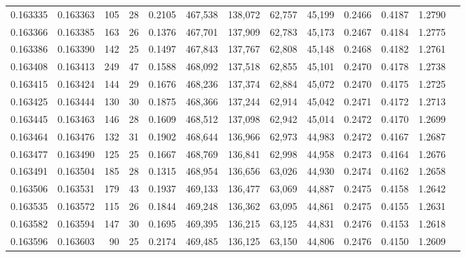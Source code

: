 \begin{tabular}{rrrrrrrrrrrrr}
0.163335 & 0.163363 &   105 &  28 &                                     0.2105 & 467,538 & 138,072 &  62,757 &  45,199 & 0.2466 & 0.4187 & 1.2790 \\
0.163366 & 0.163385 &   163 &  26 &                                     0.1376 & 467,701 & 137,909 &  62,783 &  45,173 & 0.2467 & 0.4184 & 1.2775 \\
0.163386 & 0.163390 &   142 &  25 &                                     0.1497 & 467,843 & 137,767 &  62,808 &  45,148 & 0.2468 & 0.4182 & 1.2761 \\
0.163408 & 0.163413 &   249 &  47 &                                     0.1588 & 468,092 & 137,518 &  62,855 &  45,101 & 0.2470 & 0.4178 & 1.2738 \\
0.163415 & 0.163424 &   144 &  29 &                                     0.1676 & 468,236 & 137,374 &  62,884 &  45,072 & 0.2470 & 0.4175 & 1.2725 \\
0.163425 & 0.163444 &   130 &  30 &                                     0.1875 & 468,366 & 137,244 &  62,914 &  45,042 & 0.2471 & 0.4172 & 1.2713 \\
0.163445 & 0.163463 &   146 &  28 &                                     0.1609 & 468,512 & 137,098 &  62,942 &  45,014 & 0.2472 & 0.4170 & 1.2699 \\
0.163464 & 0.163476 &   132 &  31 &                                     0.1902 & 468,644 & 136,966 &  62,973 &  44,983 & 0.2472 & 0.4167 & 1.2687 \\
0.163477 & 0.163490 &   125 &  25 &                                     0.1667 & 468,769 & 136,841 &  62,998 &  44,958 & 0.2473 & 0.4164 & 1.2676 \\
0.163491 & 0.163504 &   185 &  28 &                                     0.1315 & 468,954 & 136,656 &  63,026 &  44,930 & 0.2474 & 0.4162 & 1.2658 \\
0.163506 & 0.163531 &   179 &  43 &                                     0.1937 & 469,133 & 136,477 &  63,069 &  44,887 & 0.2475 & 0.4158 & 1.2642 \\
0.163535 & 0.163572 &   115 &  26 &                                     0.1844 & 469,248 & 136,362 &  63,095 &  44,861 & 0.2475 & 0.4155 & 1.2631 \\
0.163582 & 0.163594 &   147 &  30 &                                     0.1695 & 469,395 & 136,215 &  63,125 &  44,831 & 0.2476 & 0.4153 & 1.2618 \\
0.163596 & 0.163603 &    90 &  25 &                                     0.2174 & 469,485 & 136,125 &  63,150 &  44,806 & 0.2476 & 0.4150 & 1.2609 \\

\end{tabular}
